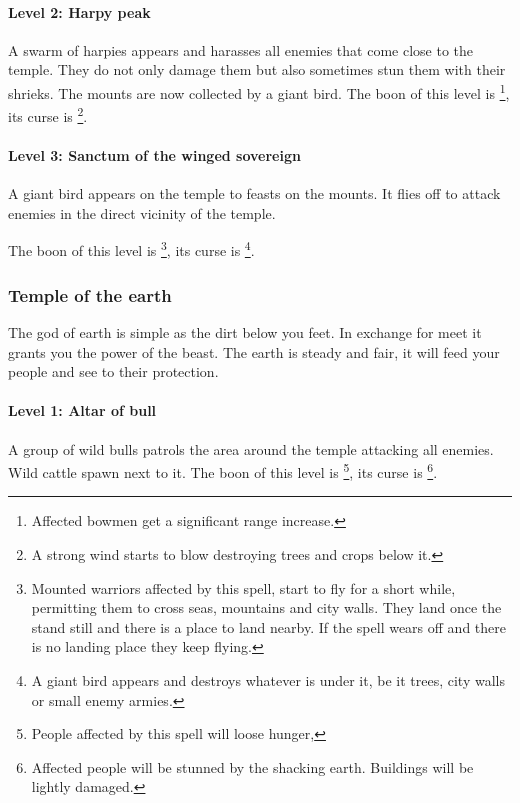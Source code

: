 \documentclass[a4paper]{book}
\begin{document}
			\paragraph{Level 2: Harpy peak}
				A swarm of harpies appears and harasses all enemies that come close to the temple.
				They do not only damage them but also sometimes stun them with their shrieks.
				The mounts are now collected by a giant bird.
				The boon of this level is \footnote{
					Affected bowmen get a significant range increase.
				},
				its curse is \footnote{
					A strong wind starts to blow destroying trees and crops below it.
				}.

			\paragraph{Level 3: Sanctum of the winged sovereign}
				A giant bird appears on the temple to feasts on the mounts.
				It flies off to attack enemies in the direct vicinity of the temple.

				The boon of this level is \footnote{
					Mounted warriors affected by this spell,
					start to fly for a short while,
					permitting them to cross seas, mountains and city walls.
					They land once the stand still and there is a place to land nearby.
					If the spell wears off and there is no landing place they keep flying.
				},
				its curse is \footnote{
					A giant bird appears and destroys whatever is under it,
					be it trees, city walls or small enemy armies.
				}.

		\subsubsection{Temple of the earth}
			The god of earth is simple as the dirt below you feet.
			In exchange for meet it grants you the power of the beast.
			The earth is steady and fair, it will feed your people and see to their protection.

			\paragraph{Level 1: Altar of bull}
				A group of wild bulls patrols the area around the temple attacking
				all enemies.
				Wild cattle spawn next to it.
				The boon of this level is \footnote{
					People affected by this spell will loose hunger,
				},
				its curse is \footnote{
					Affected people will be stunned by the shacking earth.
					Buildings will be lightly damaged.
				}.
\end{document}
